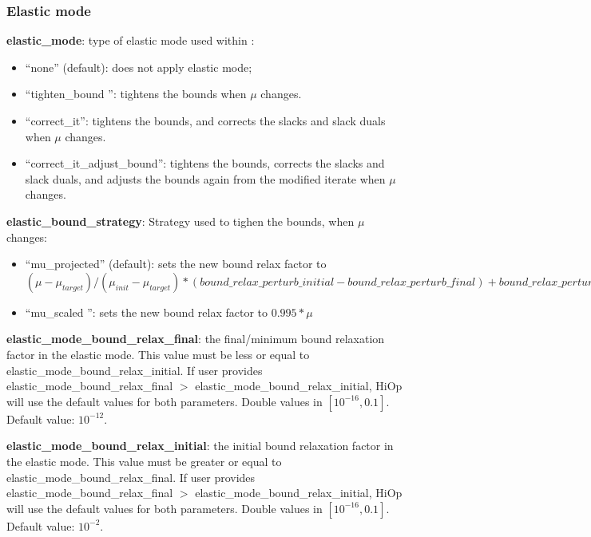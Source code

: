 \subsubsection{Elastic mode}

\noindent \textbf{elastic\_mode}: type of elastic mode used within \Hi:
\begin{itemize}
\item ``none'' (default): does not apply elastic mode;
\item ``tighten\_bound '': tightens the bounds when $\mu$ changes.
\item ``correct\_it'': tightens the bounds, and corrects the slacks and slack duals when $\mu$ changes.
\item ``correct\_it\_adjust\_bound'': tightens the bounds, corrects the slacks and slack duals, and adjusts the bounds again from the modified iterate when $\mu$ changes.
\end{itemize}
\medskip

\noindent \textbf{elastic\_bound\_strategy}: Strategy used to tighen the bounds, when $\mu$ changes:
\begin{itemize}
\item ``mu\_projected'' (default): sets the new bound relax factor to \\
$(\mu-\mu_{target}) / (\mu_{init}-\mu_{target}) * ({bound\_relax\_perturb\_initial}-{bound\_relax\_perturb\_final}) + {bound\_relax\_perturb\_final}$ 
\item ``mu\_scaled '': sets the new bound relax factor to $0.995*\mu$
\end{itemize}
\medskip

\noindent \textbf{elastic\_mode\_bound\_relax\_final}: the final/minimum bound relaxation factor in the elastic mode. This value must be less or equal to elastic\_mode\_bound\_relax\_initial. If user provides elastic\_mode\_bound\_relax\_final $>$ elastic\_mode\_bound\_relax\_initial, HiOp will use the default values for both parameters. Double values in $[10^{-16}, 0.1]$. Default value: $10^{-12}$.
\medskip

\noindent \textbf{elastic\_mode\_bound\_relax\_initial}: the initial bound relaxation factor in the elastic mode. This value must be greater or equal to elastic\_mode\_bound\_relax\_final. If user provides elastic\_mode\_bound\_relax\_final $>$ elastic\_mode\_bound\_relax\_initial, HiOp will use the default values for both parameters. Double values in $[10^{-16}, 0.1]$. Default value: $10^{-2}$.
\medskip



